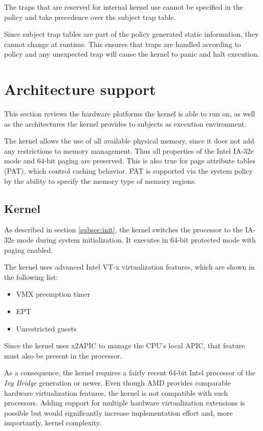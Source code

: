 The traps that are reserved for internal kernel use cannot be specified in the
policy and take precedence over the subject trap table.

Since subject trap tables are part of the policy generated static information,
they cannot change at runtime. This ensures that traps are handled according to
policy and any unexpected trap will cause the kernel to panic and halt
execution.

\section{Architecture support}\label{sec:arch-support}
This section reviews the hardware platforms the kernel is able to run on, as
well as the architectures the kernel provides to subjects as execution
environment.

The kernel allows the use of all available physical memory, since it does not
add any restrictions to memory management. Thus all properties of the Intel
IA-32e mode and 64-bit paging are preserved. This is also true for page
attribute tables (PAT), which control caching behavior. PAT is supported via the
system policy by the ability to specify the memory type of memory regions.

\subsection{Kernel}
As described in section \ref{subsec:init}, the kernel switches the processor to
the IA-32e mode during system initialization. It executes in 64-bit protected
mode with paging enabled.

The kernel uses advanced Intel VT-x virtualization features, which are shown in
the following list:

\begin{itemize}
	\item VMX preemption timer
	\item EPT
	\item Unrestricted guests
\end{itemize}

Since the kernel uses x2APIC to manage the CPU's local APIC, that feature must
also be present in the processor.

As a consequence, the kernel requires a fairly recent 64-bit Intel processor of
the \emph{Ivy Bridge} generation or newer. Even though AMD provides comparable
hardware virtualization features, the kernel is not compatible with such
processors. Adding support for multiple hardware virtualization extensions is
possible but would significantly increase implementation effort and, more
importantly, kernel complexity.

